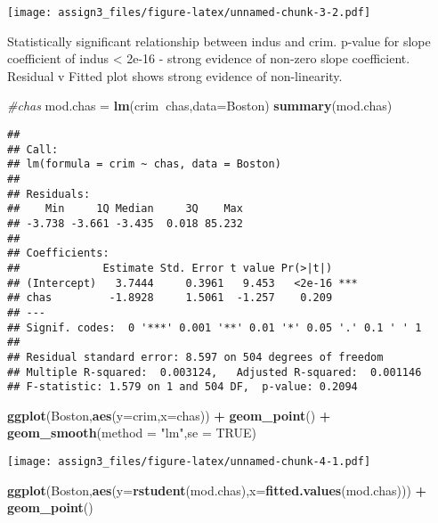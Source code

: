 \documentclass[]{article}
\newenvironment{Shaded}{\begin{snugshade}}{\end{snugshade}}
\newcommand{\CommentTok}[1]{\textcolor[rgb]{0.56,0.35,0.01}{\textit{#1}}}
\newcommand{\DataTypeTok}[1]{\textcolor[rgb]{0.13,0.29,0.53}{#1}}
\newcommand{\KeywordTok}[1]{\textcolor[rgb]{0.13,0.29,0.53}{\textbf{#1}}}
\newcommand{\NormalTok}[1]{#1}
\newcommand{\OperatorTok}[1]{\textcolor[rgb]{0.81,0.36,0.00}{\textbf{#1}}}
\newcommand{\OtherTok}[1]{\textcolor[rgb]{0.56,0.35,0.01}{#1}}
\newcommand{\StringTok}[1]{\textcolor[rgb]{0.31,0.60,0.02}{#1}}
\begin{document}
\texttt{[image: assign3\_files/figure-latex/unnamed-chunk-3-2.pdf]}

Statistically significant relationship between indus and crim. p-value
for slope coefficient of indus \textless{} 2e-16 - strong evidence of
non-zero slope coefficient. Residual v Fitted plot shows strong evidence
of non-linearity.

\begin{Shaded}
\begin{Highlighting}[]
\CommentTok{#chas}
\NormalTok{mod.chas =}\StringTok{ }\KeywordTok{lm}\NormalTok{(crim}\OperatorTok{~}\NormalTok{chas,}\DataTypeTok{data=}\NormalTok{Boston)}
\KeywordTok{summary}\NormalTok{(mod.chas)}
\end{Highlighting}
\end{Shaded}

\begin{verbatim}
## 
## Call:
## lm(formula = crim ~ chas, data = Boston)
## 
## Residuals:
##    Min     1Q Median     3Q    Max 
## -3.738 -3.661 -3.435  0.018 85.232 
## 
## Coefficients:
##             Estimate Std. Error t value Pr(>|t|)    
## (Intercept)   3.7444     0.3961   9.453   <2e-16 ***
## chas         -1.8928     1.5061  -1.257    0.209    
## ---
## Signif. codes:  0 '***' 0.001 '**' 0.01 '*' 0.05 '.' 0.1 ' ' 1
## 
## Residual standard error: 8.597 on 504 degrees of freedom
## Multiple R-squared:  0.003124,   Adjusted R-squared:  0.001146 
## F-statistic: 1.579 on 1 and 504 DF,  p-value: 0.2094
\end{verbatim}

\begin{Shaded}
\begin{Highlighting}[]
\KeywordTok{ggplot}\NormalTok{(Boston,}\KeywordTok{aes}\NormalTok{(}\DataTypeTok{y=}\NormalTok{crim,}\DataTypeTok{x=}\NormalTok{chas)) }\OperatorTok{+}\StringTok{ }\KeywordTok{geom_point}\NormalTok{() }\OperatorTok{+}\StringTok{ }\KeywordTok{geom_smooth}\NormalTok{(}\DataTypeTok{method =} \StringTok{"lm"}\NormalTok{,}\DataTypeTok{se =} \OtherTok{TRUE}\NormalTok{)}
\end{Highlighting}
\end{Shaded}

\texttt{[image: assign3\_files/figure-latex/unnamed-chunk-4-1.pdf]}

\begin{Shaded}
\begin{Highlighting}[]
\KeywordTok{ggplot}\NormalTok{(Boston,}\KeywordTok{aes}\NormalTok{(}\DataTypeTok{y=}\KeywordTok{rstudent}\NormalTok{(mod.chas),}\DataTypeTok{x=}\KeywordTok{fitted.values}\NormalTok{(mod.chas))) }\OperatorTok{+}\StringTok{ }\KeywordTok{geom_point}\NormalTok{() }
\end{Highlighting}
\end{Shaded}
\end{document}
